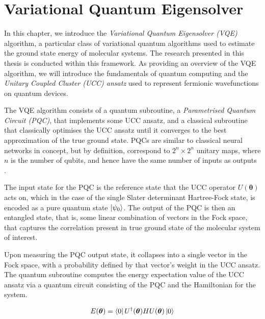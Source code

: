 \section{\label{vqe}Variational Quantum Eigensolver}

In this chapter, we introduce the \textit{Variational Quantum Eigensolver (VQE)} algorithm, a particular class of variational quantum algorithms used to estimate the ground state energy of molecular systems. The research presented in this thesis is conducted within this framework. As providing an overview of the VQE algorithm, we will introduce the fundamentals of quantum computing and the \textit{Unitary Coupled Cluster (UCC) ansatz} used to represent fermionic wavefunctions on quantum devices.

The VQE algorithm consists of a quantum subroutine, a \textit{Parametrised Quantum Circuit (PQC)}, that implements some UCC ansatz, and a classical subroutine that classically optimises the UCC ansatz until it converges to the best approximation of the true ground state. PQCs are similar to classical neural networks in concept, but by definition, correspond to $2^n \times 2^n$ unitary maps, where $n$ is the number of qubits, and hence have the same number of inputs as outputs \cite{Yeung2020}.

The input state for the PQC is the reference state that the UCC operator $U(\bm\theta)$ acts on, which in the case of the single Slater determinant Hartree-Fock state, is encoded as a pure quantum state $\ket{\psi_0}$. The output of the PQC is then an entangled state, that is, some linear combination of vectors in the Fock space, that captures the correlation present in true ground state of the molecular system of interest.

Upon measuring the PQC output state, it collapses into a single vector in the Fock space, with a probability defined by that vector's weight in the UCC ansatz. The quantum subroutine computes the energy expectation value of the UCC ansatz via a quantum circuit consisting of the PQC and the Hamiltonian for the system.

\begin{equation*}
    E(\bm\theta) = \bra{0} U^\dagger(\bm\theta) H U(\bm\theta) \ket{0} 
\end{equation*}

